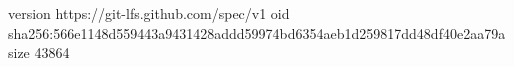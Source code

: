 version https://git-lfs.github.com/spec/v1
oid sha256:566e1148d559443a9431428addd59974bd6354aeb1d259817dd48df40e2aa79a
size 43864
